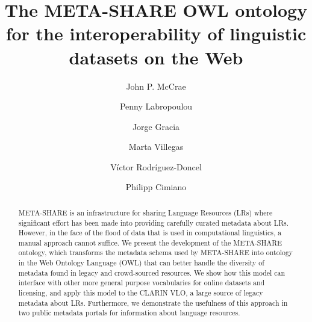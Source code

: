 \documentclass{llncs}
\begin{document}
\title{The META-SHARE OWL ontology for the interoperability of linguistic datasets on the Web}
%
%
\author{John P. McCrae \and Penny Labropoulou \and Jorge
Gracia \and Marta Villegas \and V\'ictor Rodr\'iguez-Doncel \and Philipp Cimiano}
%
%
%
\maketitle %
\begin{abstract}
    META-SHARE is an infrastructure for sharing Language Resources (LRs) where significant effort has been made into
    providing carefully curated metadata about LRs. However, in the face of the flood of data that is used in computational
    linguistics, a manual approach cannot suffice. We present the development of
    the META-SHARE ontology, which transforms the metadata schema used by META-SHARE into ontology in the Web Ontology Language (OWL) that can better handle the diversity of
    metadata found in legacy and crowd-sourced resources. We show how this model can interface with other more general
    purpose vocabularies for online datasets and licensing, and apply this model
    to the CLARIN VLO, a large source of legacy metadata about LRs. Furthermore,
    we demonstrate the usefulness of this approach in two public metadata
    portals for information about language resources.
\end{abstract}
\end{document}
